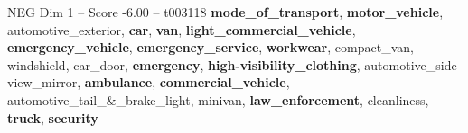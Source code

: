 \begin{textsample}{NEG Dim 1 – Score -6.00 – t003118}  \label{ex:f1_neg_005}
\textbf{mode\_of\_transport}, \textbf{motor\_vehicle}, automotive\_exterior, \textbf{car}, \textbf{van}, \textbf{light\_commercial\_vehicle}, \textbf{emergency\_vehicle}, \textbf{emergency\_service}, \textbf{workwear}, compact\_van, windshield, car\_door, \textbf{emergency}, \textbf{high-visibility\_clothing}, automotive\_side-view\_mirror, \textbf{ambulance}, \textbf{commercial\_vehicle}, automotive\_tail\_\&\_brake\_light, minivan, \textbf{law\_enforcement}, cleanliness, \textbf{truck}, \textbf{security}

\end{textsample}
